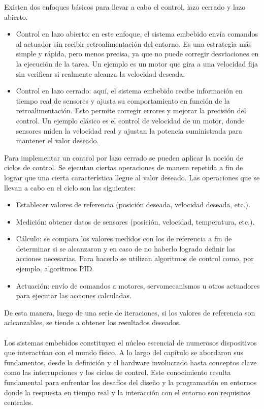 Existen dos enfoques básicos para llevar a cabo el control, lazo cerrado y lazo abierto.

\begin{itemize}
\item Control en lazo abierto: en este enfoque, el sistema embebido envía comandos al actuador sin recibir retroalimentación del entorno. Es una estrategia más simple y rápida, pero menos precisa, ya que no puede corregir desviaciones en la ejecución de la tarea. Un ejemplo es un motor que gira a una velocidad fija sin verificar si realmente alcanza la velocidad deseada.

\item Control en lazo cerrado: aquí, el sistema embebido recibe información en tiempo real de sensores y ajusta su comportamiento en función de la retroalimentación. Esto permite corregir errores y mejorar la precisión del control. Un ejemplo clásico es el control de velocidad de un motor, donde sensores miden la velocidad real y ajustan la potencia suministrada para mantener el valor deseado.
\end{itemize}

Para implementar un control por lazo cerrado se pueden aplicar la noción de ciclos de control. Se ejecutan ciertas operaciones de manera repetida a fin de lograr que una cierta característica llegue al valor deseado. Las operaciones que se llevan a cabo en el ciclo son las siguientes:

\begin{itemize}
\item Establecer valores de referencia (posición deseada, velocidad deseada, etc.).
\item Medición: obtener datos de sensores (posición, velocidad, temperatura, etc.).
\item Cálculo: se compara los valores medidos con los de referencia a fin de determinar si se alcanzaron y en caso de no haberlo logrado definir las acciones necesarias. Para hacerlo se utilizan algoritmos de control como, por ejemplo, algoritmos \gls{PID}.
\item Actuación: envío de comandos a motores, \gls{servomecanismos} u otros actuadores para ejecutar las acciones calculadas.
\end{itemize}

De esta manera, luego de una serie de iteraciones, si los valores de referencia son aclcanzables, se tiende a obtener los resultados deseados.
\\\\
Los sistemas embebidos constituyen el núcleo escencial de numerosos dispositivos que interactúan con el mundo físico. A lo largo del capítulo se abordaron sus fundamentos, desde la definición y el hardware involucrado hasta conceptos clave como las interrupciones y los ciclos de control. Este conocimiento resulta fundamental para enfrentar los desafíos del diseño y la programación en entornos donde la respuesta en tiempo real y la interacción con el entorno son requisitos centrales.
